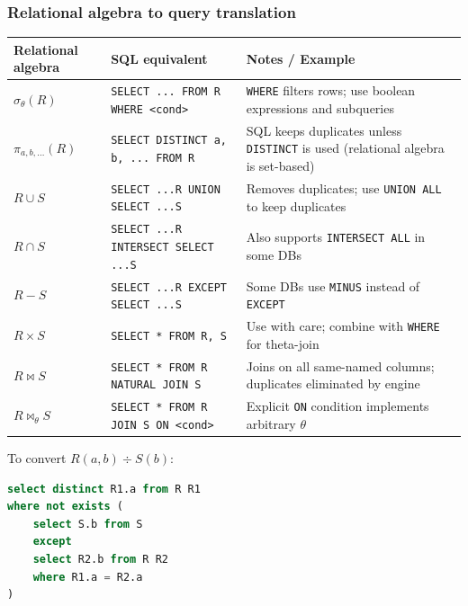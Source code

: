 \subsubsection{Relational algebra to query translation}
\begin{tabular}{|l|l|p{6cm}|}
    \hline
    Relational algebra     & SQL equivalent                           & Notes / Example                                                                       \\ \hline
    $\sigma_{\theta}(R)$   & \verb|SELECT ... FROM R WHERE <cond>|    & \verb|WHERE| filters rows; use boolean expressions and subqueries                     \\ \hline
    $\pi_{a,b,\dots}(R)$   & \verb|SELECT DISTINCT a, b, ... FROM R|  & SQL keeps duplicates unless \verb|DISTINCT| is used (relational algebra is set-based) \\ \hline
    $R \cup S$             & \verb|SELECT ...R UNION SELECT ...S|     & Removes duplicates; use \verb|UNION ALL| to keep duplicates                           \\ \hline
    $R \cap S$             & \verb|SELECT ...R INTERSECT SELECT ...S| & Also supports \verb|INTERSECT ALL| in some DBs                                        \\ \hline
    $R - S$                & \verb|SELECT ...R EXCEPT SELECT ...S|    & Some DBs use \verb|MINUS| instead of \verb|EXCEPT|                                    \\ \hline
    $R \times S$           & \verb|SELECT * FROM R, S|                & Use with care; combine with \verb|WHERE| for theta-join                               \\ \hline
    $R \bowtie S$          & \verb|SELECT * FROM R NATURAL JOIN S|    & Joins on all same-named columns; duplicates eliminated by engine                      \\ \hline
    $R \bowtie_{\theta} S$ & \verb|SELECT * FROM R JOIN S ON <cond>|  & Explicit \verb|ON| condition implements arbitrary $\theta$                            \\ \hline
\end{tabular}

To convert $R(a,b) \div S(b)$:

\begin{lstlisting}[language=SQL]
select distinct R1.a from R R1
where not exists (
    select S.b from S
    except
    select R2.b from R R2
    where R1.a = R2.a
)
\end{lstlisting}

